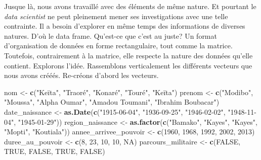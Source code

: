 \documentclass[]{book}
\newenvironment{Shaded}{\begin{snugshade}}{\end{snugshade}}
\newcommand{\KeywordTok}[1]{\textcolor[rgb]{0.13,0.29,0.53}{\textbf{#1}}}
\newcommand{\DecValTok}[1]{\textcolor[rgb]{0.00,0.00,0.81}{#1}}
\newcommand{\StringTok}[1]{\textcolor[rgb]{0.31,0.60,0.02}{#1}}
\newcommand{\OtherTok}[1]{\textcolor[rgb]{0.56,0.35,0.01}{#1}}
\newcommand{\NormalTok}[1]{#1}
\begin{document}
Jusque là, nous avons travaillé avec des éléments de même nature. Et
pourtant le \emph{data scientist} ne peut pleinement mener ses
investigations avec une telle contrainte. Il a besoin d'explorer en même
temps des informations de diverses natures. D'où le data frame.
Qu'est-ce que c'est au juste? Un format d'organisation de données en
forme rectangulaire, tout comme la matrice. Toutefois, contrairement à
la matrice, elle respecte la nature des données qu'elle contient.
Explorons l'idée. Rassemblons verticalement les différents vecteurs que
nous avons crééés. Re-créons d'abord les vecteurs.

\begin{Shaded}
\begin{Highlighting}[]
\NormalTok{nom <-}\StringTok{ }\KeywordTok{c}\NormalTok{(}\StringTok{"Keïta"}\NormalTok{, }\StringTok{"Traoré"}\NormalTok{, }\StringTok{"Konaré"}\NormalTok{, }\StringTok{"Touré"}\NormalTok{, }\StringTok{"Keïta"}\NormalTok{)}
\NormalTok{prenom <-}\StringTok{ }\KeywordTok{c}\NormalTok{(}\StringTok{"Modibo"}\NormalTok{, }\StringTok{"Moussa"}\NormalTok{, }\StringTok{"Alpha Oumar"}\NormalTok{, }\StringTok{"Amadou Toumani"}\NormalTok{, }\StringTok{"Ibrahim Boubacar"}\NormalTok{)}
\NormalTok{date_naissance <-}\StringTok{ }\KeywordTok{as.Date}\NormalTok{(}\KeywordTok{c}\NormalTok{(}\StringTok{"1915-06-04"}\NormalTok{, }\StringTok{"1936-09-25"}\NormalTok{, }\StringTok{"1946-02-02"}\NormalTok{, }\StringTok{"1948-11-04"}\NormalTok{, }\StringTok{"1945-01-29"}\NormalTok{))}
\NormalTok{region_naissance <-}\StringTok{ }\KeywordTok{as.factor}\NormalTok{(}\KeywordTok{c}\NormalTok{(}\StringTok{"Bamako"}\NormalTok{, }\StringTok{"Kayes"}\NormalTok{, }\StringTok{"Kayes"}\NormalTok{, }\StringTok{"Mopti"}\NormalTok{, }\StringTok{"Koutiala"}\NormalTok{))}
\NormalTok{annee_arrivee_pouvoir <-}\StringTok{ }\KeywordTok{c}\NormalTok{(}\DecValTok{1960}\NormalTok{, }\DecValTok{1968}\NormalTok{, }\DecValTok{1992}\NormalTok{, }\DecValTok{2002}\NormalTok{, }\DecValTok{2013}\NormalTok{)}
\NormalTok{duree_au_pouvoir <-}\StringTok{ }\KeywordTok{c}\NormalTok{(}\DecValTok{8}\NormalTok{, }\DecValTok{23}\NormalTok{, }\DecValTok{10}\NormalTok{, }\DecValTok{10}\NormalTok{, }\OtherTok{NA}\NormalTok{)}
\NormalTok{parcours_militaire <-}\StringTok{ }\KeywordTok{c}\NormalTok{(}\OtherTok{FALSE}\NormalTok{, }\OtherTok{TRUE}\NormalTok{, }\OtherTok{FALSE}\NormalTok{, }\OtherTok{TRUE}\NormalTok{, }\OtherTok{FALSE}\NormalTok{)}
\end{Highlighting}
\end{Shaded}
\end{document}
